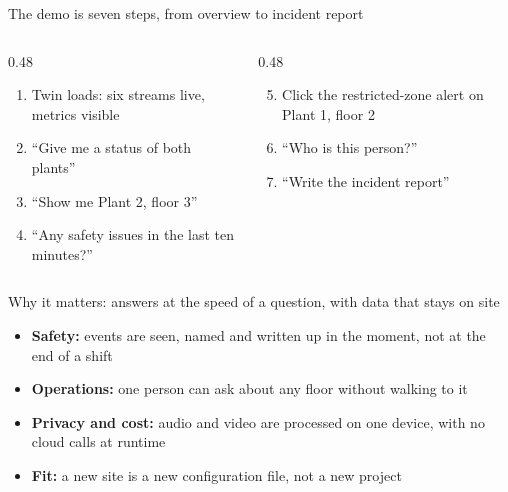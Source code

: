 \documentclass[aspectratio=169,11pt,t]{beamer}
\begin{document}
\begin{frame}{The demo is seven steps, from overview to incident report}
  \begin{columns}[T,onlytextwidth]
    \begin{column}{0.48\textwidth}
      \begin{enumerate}
        \item Twin loads: six streams live, metrics visible
        \item ``Give me a status of both plants''
        \item ``Show me Plant 2, floor 3''
        \item ``Any safety issues in the last ten minutes?''
      \end{enumerate}
    \end{column}
    \begin{column}{0.48\textwidth}
      \begin{enumerate}
        \setcounter{enumi}{4}
        \item Click the restricted-zone alert on Plant 1, floor 2
        \item ``Who is this person?''
        \item ``Write the incident report''
      \end{enumerate}
    \end{column}
  \end{columns}
\end{frame}

\begin{frame}{Why it matters: answers at the speed of a question, with data that stays on site}
  \begin{itemize}
    \item \textbf{Safety:} events are seen, named and written up in the moment, not at the end of a shift
    \item \textbf{Operations:} one person can ask about any floor without walking to it
    \item \textbf{Privacy and cost:} audio and video are processed on one device, with no cloud calls at runtime
    \item \textbf{Fit:} a new site is a new configuration file, not a new project
  \end{itemize}
\end{frame}

\begin{frame}
\end{frame}
\end{document}
